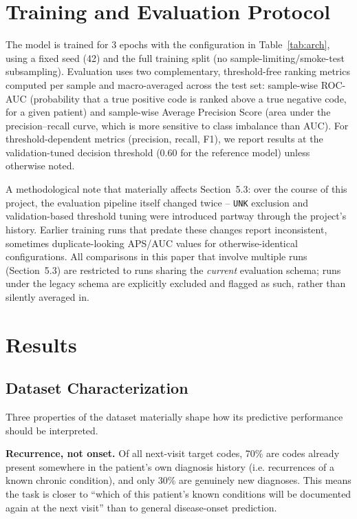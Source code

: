 \documentclass[11pt]{article}
\begin{document}
\section{Training and Evaluation Protocol}

The model is trained for 3 epochs with the configuration in
Table~\ref{tab:arch}, using a fixed seed (42) and the full training split
(no sample-limiting/smoke-test subsampling). Evaluation uses two
complementary, threshold-free ranking metrics computed per sample and
macro-averaged across the test set: sample-wise ROC-AUC (probability that a
true positive code is ranked above a true negative code, for a given patient)
and sample-wise Average Precision Score (area under the precision--recall
curve, which is more sensitive to class imbalance than AUC). For
threshold-dependent metrics (precision, recall, F1), we report results at the
validation-tuned decision threshold (0.60 for the reference model) unless
otherwise noted.

A methodological note that materially affects Section~5.3: over the course of
this project, the evaluation pipeline itself changed twice -- \texttt{UNK}
exclusion and validation-based threshold tuning were introduced partway
through the project's history. Earlier training runs that predate these
changes report inconsistent, sometimes duplicate-looking APS/AUC values for
otherwise-identical configurations. All comparisons in this paper that involve
multiple runs (Section~5.3) are restricted to runs sharing the \emph{current}
evaluation schema; runs under the legacy schema are explicitly excluded and
flagged as such, rather than silently averaged in.

\section{Results}

\subsection{Dataset Characterization}

Three properties of the dataset materially shape how its predictive
performance should be interpreted.

\textbf{Recurrence, not onset.} Of all next-visit target codes, 70\% are
codes already present somewhere in the patient's own diagnosis history (i.e.
recurrences of a known chronic condition), and only 30\% are genuinely new
diagnoses. This means the task is closer to ``which of this patient's known
conditions will be documented again at the next visit'' than to general
disease-onset prediction.
\end{document}
